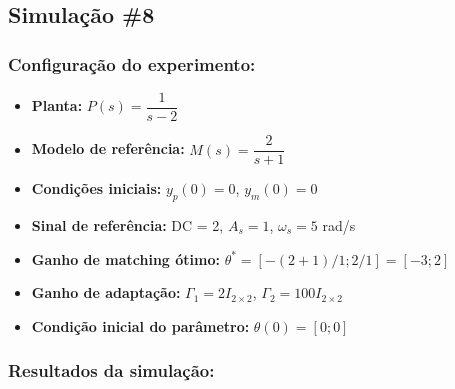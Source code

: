 \documentclass[10pt]{article}
\begin{document}
\newpage

\subsection{Simulação \#8}
\subsubsection{Configuração do experimento:}
\begin{itemize}
\item \textbf{Planta:} $P(s) = \dfrac{1}{s - 2}$
\item \textbf{Modelo de referência:} $M(s) = \dfrac{2}{s + 1}$
\item \textbf{Condições iniciais:} $y_p(0)=0$, $y_m(0)=0$
\item \textbf{Sinal de referência:} DC = 2, $A_s=1$, $\omega_s=5$ rad/s
\item \textbf{Ganho de matching ótimo:} $\theta^* = [-(2+1)/1;2/1] = [-3;2]$
\item \textbf{Ganho de adaptação:} $\Gamma_1 = 2I_{2\times2}$, $\Gamma_2 = 100I_{2\times2}$
\item \textbf{Condição inicial do parâmetro:} $\theta(0) = [0;0]$
\end{itemize}

\subsubsection{Resultados da simulação:}
\end{document}
